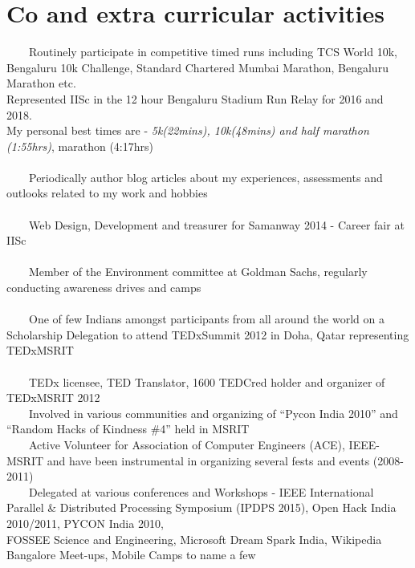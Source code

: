 \documentclass[a4paper,10pt]{article} %
\newcommand{\tabitem}{~~\llap{\textbullet}~~}
\begin{document}
\section{Co and extra curricular activities}
\tabitem Routinely participate in competitive timed runs including TCS World 10k, Bengaluru 10k Challenge, Standard Chartered Mumbai Marathon, Bengaluru Marathon etc. \\ Represented IISc in the 12 hour Bengaluru Stadium Run Relay for 2016 and 2018. \\ {\footnotesize My personal best times are - \textit{5k(22mins), \space 10k(48mins) and half marathon (1:55hrs)}, marathon (4:17hrs) }\\
\\
\tabitem Periodically author blog articles about my experiences, assessments and outlooks related to my work and hobbies \\
\\
\tabitem Web Design, Development and treasurer for Samanway 2014 - Career fair at IISc \\
\\ 
\tabitem Member of the Environment committee at Goldman Sachs, regularly conducting awareness drives and camps \\
\\
\tabitem One of few Indians amongst participants from all around the world on a Scholarship Delegation to attend TEDxSummit 2012 in Doha, Qatar representing TEDxMSRIT \\
\\
\tabitem TEDx licensee, TED Translator, 1600 TEDCred holder and organizer of TEDxMSRIT 2012\\
\tabitem Involved in various communities and organizing of “Pycon India 2010” and “Random Hacks of Kindness \#4” held in MSRIT\\
\tabitem Active Volunteer for Association of Computer Engineers (ACE), IEEE-MSRIT and have been instrumental in organizing several fests and events (2008-2011)\\
\tabitem Delegated at various conferences and Workshops - IEEE International Parallel \& Distributed Processing Symposium (IPDPS 2015), Open Hack India 2010/2011, PYCON India 2010,\\ FOSSEE Science and Engineering, Microsoft Dream Spark India, Wikipedia Bangalore Meet-ups, Mobile Camps to name a few\\
\\
\end{document}
